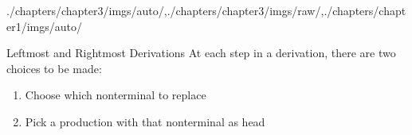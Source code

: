 \begin{graphicspathcontext}{{./chapters/chapter3/imgs/auto/},{./chapters/chapter3/imgs/raw/},{./chapters/chapter1/imgs/auto/}}
\begin{bibunit}[apalike]
\begin{frame}{{Leftmost and Rightmost} Derivations}
	At each step in a derivation, there are two choices to be made:
		\begin{enumerate}
		\item Choose which nonterminal to replace
		\item Pick a production with that nonterminal as head
		\end{enumerate}
	\begin{center}
		\hspace{2cm}
	\end{center}
\end{frame}


\end{bibunit}
\end{graphicspathcontext}
